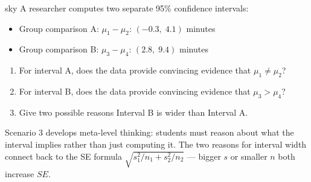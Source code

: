 \documentclass[10pt]{article}
\begin{document}
\begin{scenariobox}{sky}
A researcher computes two separate 95\% confidence intervals:
\begin{itemize}
  \item Group comparison A: $\mu_1 - \mu_2$: $(-0.3, \; 4.1)$ minutes
  \item Group comparison B: $\mu_3 - \mu_4$: $(2.8, \; 9.4)$ minutes
\end{itemize}

\begin{enumerate}[label=\alph*.]
  \item For interval A, does the data provide convincing evidence that $\mu_1 \ne \mu_2$?

  \item For interval B, does the data provide convincing evidence that $\mu_3 > \mu_4$?

  \item Give two possible reasons Interval B is wider than Interval A.
\end{enumerate}
\end{scenariobox}

\begin{teachernote}
Scenario 3 develops meta-level thinking: students must reason about what the interval
implies rather than just computing it. The two reasons for interval width connect back to
the SE formula $\sqrt{s_1^2/n_1 + s_2^2/n_2}$ --- bigger $s$ or smaller $n$ both increase $SE$.
\end{teachernote}
\end{document}
